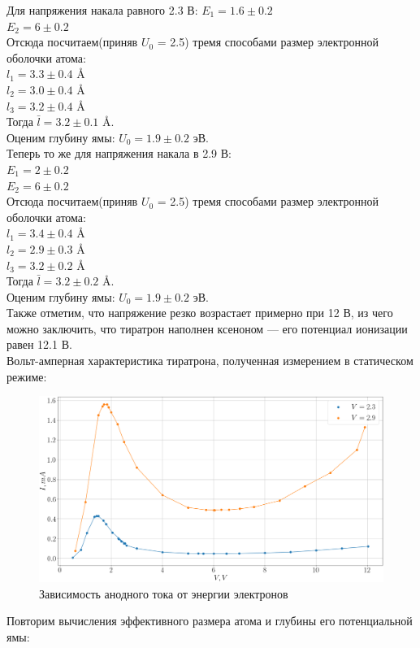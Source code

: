 \documentclass[11pt]{article}
\begin{document}
Для напряжения накала равного 2.3 В:
$E_1 = 1.6 \pm 0.2$ \\
$E_2 = 6 \pm 0.2$ \\
Отсюда посчитаем(приняв $U_0$ = 2.5) тремя способами размер электронной оболочки атома: \\
$l_1 = 3.3 \pm 0.4 $ \AA{} \\
$l_2 = 3.0 \pm 0.4$ \AA{} \\
$l_3 = 3.2 \pm 0.4$ \AA{} \\
Тогда $\bar{l} = 3.2 \pm 0.1$ \AA{}. \\
Оценим глубину ямы: $U_0 = 1.9 \pm 0.2$ эВ. \\
Теперь то же для напряжения накала в 2.9 В: \\
$E_1 = 2 \pm 0.2$ \\
$E_2 = 6 \pm 0.2$ \\
Отсюда посчитаем(приняв $U_0$ = 2.5) тремя способами размер электронной оболочки атома: \\
$l_1 = 3.4 \pm 0.4 $ \AA{} \\
$l_2 = 2.9 \pm 0.3$ \AA{} \\
$l_3 = 3.2 \pm 0.2$ \AA{} \\
Тогда $\bar{l} = 3.2 \pm 0.2$ \AA{}. \\
Оценим глубину ямы: $U_0 = 1.9 \pm 0.2$ эВ. \\
Также отметим, что напряжение резко возрастает примерно при 12 В, из чего можно заключить, что тиратрон наполнен ксеноном --- его потенциал ионизации равен 12.1 В. \\
  Вольт-амперная характеристика тиратрона, полученная измерением в статическом режиме:
   \begin{figure}[H]
\centering
\includegraphics[width=0.95\linewidth]{f1.png}
\caption{Зависимость анодного тока от энергии электронов}
\end{figure}
Повторим вычисления эффективного размера атома и глубины его потенциальной ямы: \\
\end{document}
